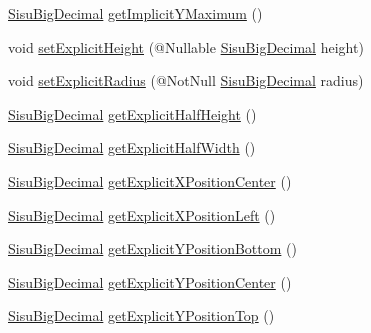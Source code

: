 \begin{DoxyCompactItemize}
\item 
\hyperlink{classcom_1_1aarrelaakso_1_1drawl_1_1_sisu_big_decimal}{Sisu\+Big\+Decimal} \hyperlink{classcom_1_1aarrelaakso_1_1drawl_1_1_circle_a69c8084493cd0d4c899235c171fe127e}{get\+Implicit\+Y\+Maximum} ()
\item 
void \hyperlink{classcom_1_1aarrelaakso_1_1drawl_1_1_circle_a1f11256f2fbfb54b387c0e71d7abfd7d}{set\+Explicit\+Height} (@Nullable \hyperlink{classcom_1_1aarrelaakso_1_1drawl_1_1_sisu_big_decimal}{Sisu\+Big\+Decimal} height)
\item 
void \hyperlink{classcom_1_1aarrelaakso_1_1drawl_1_1_circle_a12d16906e4e41d57f9e453f6b508bfa7}{set\+Explicit\+Radius} (@Not\+Null \hyperlink{classcom_1_1aarrelaakso_1_1drawl_1_1_sisu_big_decimal}{Sisu\+Big\+Decimal} radius)
\item 
\hyperlink{classcom_1_1aarrelaakso_1_1drawl_1_1_sisu_big_decimal}{Sisu\+Big\+Decimal} \hyperlink{classcom_1_1aarrelaakso_1_1drawl_1_1_shape_aa3857406bc4f6c7373f1cd7cbe16dfd9}{get\+Explicit\+Half\+Height} ()
\item 
\hyperlink{classcom_1_1aarrelaakso_1_1drawl_1_1_sisu_big_decimal}{Sisu\+Big\+Decimal} \hyperlink{classcom_1_1aarrelaakso_1_1drawl_1_1_shape_a4fba348eaeef3c258aa7443410137ad7}{get\+Explicit\+Half\+Width} ()
\item 
\hyperlink{classcom_1_1aarrelaakso_1_1drawl_1_1_sisu_big_decimal}{Sisu\+Big\+Decimal} \hyperlink{classcom_1_1aarrelaakso_1_1drawl_1_1_shape_a079e4ec300c2ab3cd2514230b7428ea4}{get\+Explicit\+X\+Position\+Center} ()
\item 
\hyperlink{classcom_1_1aarrelaakso_1_1drawl_1_1_sisu_big_decimal}{Sisu\+Big\+Decimal} \hyperlink{classcom_1_1aarrelaakso_1_1drawl_1_1_shape_a4e26548d18a063bff6bb0781526b909f}{get\+Explicit\+X\+Position\+Left} ()
\item 
\hyperlink{classcom_1_1aarrelaakso_1_1drawl_1_1_sisu_big_decimal}{Sisu\+Big\+Decimal} \hyperlink{classcom_1_1aarrelaakso_1_1drawl_1_1_shape_adfeaa06d8a6943d8f5bc90e91f0b4fac}{get\+Explicit\+Y\+Position\+Bottom} ()
\item 
\hyperlink{classcom_1_1aarrelaakso_1_1drawl_1_1_sisu_big_decimal}{Sisu\+Big\+Decimal} \hyperlink{classcom_1_1aarrelaakso_1_1drawl_1_1_shape_a6499eaa6fd9cdef3d77fe20a5b039401}{get\+Explicit\+Y\+Position\+Center} ()
\item 
\hyperlink{classcom_1_1aarrelaakso_1_1drawl_1_1_sisu_big_decimal}{Sisu\+Big\+Decimal} \hyperlink{classcom_1_1aarrelaakso_1_1drawl_1_1_shape_af5d7293539d67234c9941e6abc3e642b}{get\+Explicit\+Y\+Position\+Top} ()

\end{DoxyCompactItemize}
